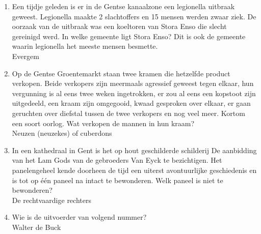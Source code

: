 \begin{enumerate}
\item{Een tijdje geleden is er in de Gentse kanaalzone een legionella uitbraak geweest. Legionella maakte 2 slachtoffers en 15 mensen werden zwaar ziek. De oorzaak van de uitbraak was een koeltoren van Stora Enso die slecht gereinigd werd. In welke gemeente ligt Stora Enso? Dit is ook de gemeente waarin legionella het meeste mensen besmette.\\ Evergem}
\item{Op de Gentse Groentemarkt staan twee kramen die hetzelfde product verkopen. Beide verkopers zijn meermaals agressief geweest tegen elkaar, hun vergunning is al eens twee weken ingetrokken, er zou al eens een kopstoot zijn uitgedeeld, een kraam zijn omgegooid, kwaad gesproken over elkaar, er gaan geruchten over diefstal tussen de twee verkopers en nog veel meer. Kortom een soort oorlog. Wat verkopen de mannen in hun kraam?\\ Neuzen (neuzekes) of cuberdons}
\item{In een kathedraal in Gent is het op hout geschilderde schilderij De aanbidding van het Lam Gods van de gebroeders Van Eyck te bezichtigen. Het panelengeheel kende doorheen de tijd een uiterst avontuurlijke geschiedenis en is tot op één paneel na intact te bewonderen. Welk paneel is niet te bewonderen?\\ De rechtvaardige rechters}

\item{Wie is de uitvoerder van volgend nummer?\\ Walter de Buck}
\end{enumerate}


